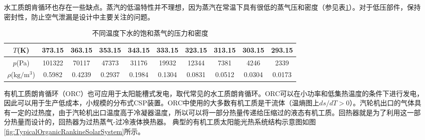 水工质朗肯循环也存在一些缺点。蒸汽的低温特性并不理想，因为蒸汽在常温下具有很低的蒸气压和密度（参见表\ref{tab:waterT_P_D}）。对于低压部件，保持密封性，防止空气泄漏是设计中主要关注的问题。
\begin{table}[htbp]
\setlength{\abovecaptionskip}{-10pt}
	\caption{不同温度下水的饱和蒸气的压力和密度}
	\begin{center}
	\begin{tabular}{cccccccccc}
		\toprule	
		    $T$(K)    &	373.15	    &    363.15    &    353.15    &    343.15    &    333.15    &    323.15    &    313.15    &    303.15    &    293.15\\
		\midrule	
		    $p$(Pa)    &    101322        &    70117    &    47373    &    31176    &    19932    &    12344    &    7381    &    4246    &    2339\\
		    $\rho$($\mathrm{kg/m^3}$)    &    0.5982        &    0.4239    &    0.2937    &    0.1984    &    0.1304    &    0.0831    &    0.0512    &    0.0304    &    0.0173\\
		\bottomrule
	\end{tabular}
	\end{center}
	\label{tab:waterT_P_D}
\end{table}

有机工质朗肯循环（ORC）也可应用于太阳能槽式发电，取代常见的水工质朗肯循环。ORC可以在小功率和低集热温度的条件下进行发电，因此可以用于生产低成本，小规模的分布式CSP装置。ORC中使用的大多数有机工质是干流体（温熵图上$ds/dT > 0$）。汽轮机出口的气体具有一定的过热度，由于汽轮机出口温度高于冷凝器温度，所以可以将一部分热量传递给压缩过的液态有机工质。回热器就是为了利用这一部分热量而设计的，回热器为过热蒸气-过冷液体换热器。
典型的有机工质太阳能光热系统结构示意图如图\ref{fig:TypicalOrganicRankineSolarSystem}所示。


